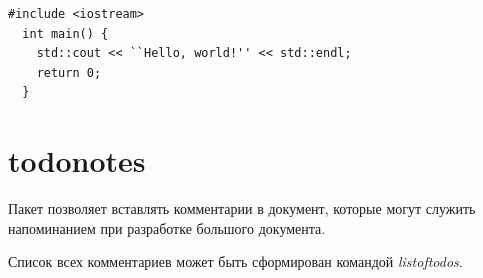 \begin{minipage}{\linewidth} %
\begin{lstlisting}[caption={Hello,world!},label=l1]
  #include <iostream>
  int main() {
    std::cout << ``Hello, world!'' << std::endl;
    return 0;
  }
\end{lstlisting}
\end{minipage}

\section{todonotes}
Пакет позволяет вставлять комментарии в документ, которые могут служить напоминанием при разработке большого документа.

Список всех комментариев может быть сформирован командой {\em listoftodos}.

\clearpage
\printbibliography


